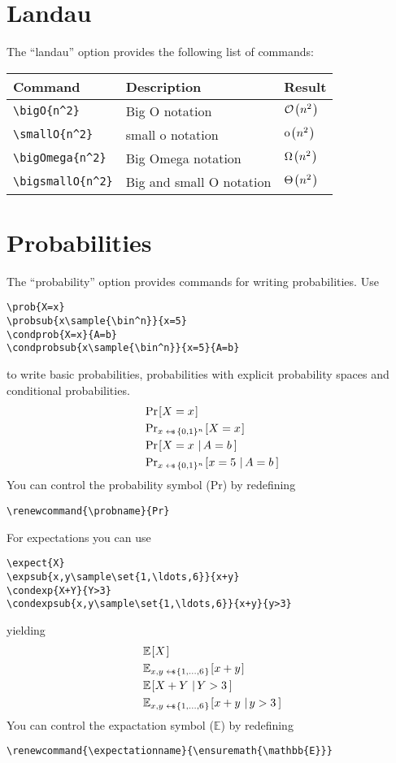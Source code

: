 \documentclass[a4paper]{report}
\begin{document}
\section{Landau}
The \enquote{landau} option provides the following list of commands:

\begin{center}
\begin{tabular}{l l l}
\textbf{Command} & \textbf{Description} & \textbf{Result} \\\hline
\lstinline$\bigO{n^2}$ & Big O notation & $\bigO{n^2}$  \\
\lstinline$\smallO{n^2}$ & small o notation & $\smallO{n^2}$  \\
\lstinline$\bigOmega{n^2}$ & Big Omega notation & $\bigOmega{n^2}$  \\
\lstinline$\bigsmallO{n^2}$ & Big and small O notation & $\bigsmallO{n^2}$  
\end{tabular}
\end{center}


\section{Probabilities}
The \enquote{probability} option provides commands for writing probabilities. Use
\begin{lstlisting}
\prob{X=x}
\probsub{x\sample{\bin^n}}{x=5}
\condprob{X=x}{A=b}
\condprobsub{x\sample{\bin^n}}{x=5}{A=b}
\end{lstlisting}
to write basic probabilities, probabilities with explicit probability spaces and conditional probabilities.
\begin{align*}
& \prob{X=x} \\
& \probsub{x\sample{\bin^n}}{X=x} \\
& \condprob{X=x}{A=b} \\
& \condprobsub{x\sample{\bin^n}}{x=5}{A=b}
\end{align*}
You can control the probability symbol (Pr) by redefining
\begin{lstlisting}
\renewcommand{\probname}{Pr}
\end{lstlisting}

For expectations you can use
\begin{lstlisting}
\expect{X}
\expsub{x,y\sample\set{1,\ldots,6}}{x+y}
\condexp{X+Y}{Y>3}
\condexpsub{x,y\sample\set{1,\ldots,6}}{x+y}{y>3}
\end{lstlisting}
yielding
\begin{align*}
& \expect{X} \\
& \expsub{x,y\sample\set{1,\ldots,6}}{x+y} \\
& \condexp{X+Y}{Y>3} \\
& \condexpsub{x,y\sample\set{1,\ldots,6}}{x+y}{y>3} 
\end{align*}
You can control the expactation symbol ($\mathbb{E}$) by redefining
\begin{lstlisting}
\renewcommand{\expectationname}{\ensuremath{\mathbb{E}}}
\end{lstlisting}
\end{document}
